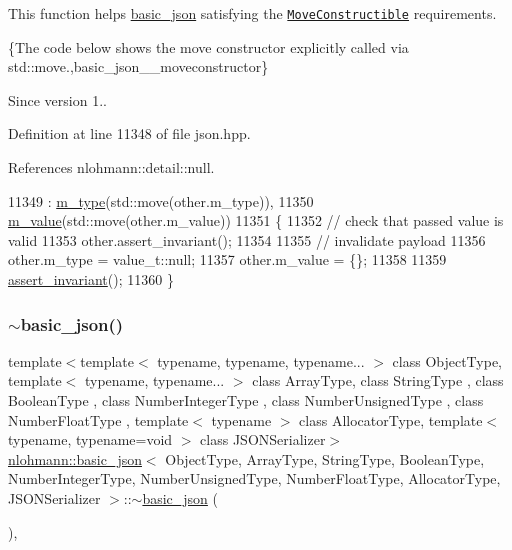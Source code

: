 This function helps {\ttfamily \hyperlink{classnlohmann_1_1basic__json}{basic\+\_\+json}} satisfying the \href{http://en.cppreference.com/w/cpp/concept/MoveConstructible}{\tt Move\+Constructible} requirements.

\{The code below shows the move constructor explicitly called via std\+::move.,basic\+\_\+json\+\_\+\+\_\+moveconstructor\}

\begin{DoxySince}{Since}
version 1.. 
\end{DoxySince}


Definition at line 11348 of file json.\+hpp.



References nlohmann\+::detail\+::null.


\begin{DoxyCode}
11349         : \hyperlink{classnlohmann_1_1basic__json_a91990b60d7d4d67968a2c1db677536e7}{m\_type}(std::move(other.m\_type)),
11350           \hyperlink{classnlohmann_1_1basic__json_aeb0814f76966f99290cb29e127c90a77}{m\_value}(std::move(other.m\_value))
11351     \{
11352         \textcolor{comment}{// check that passed value is valid}
11353         other.assert\_invariant();
11354 
11355         \textcolor{comment}{// invalidate payload}
11356         other.m\_type = value\_t::null;
11357         other.m\_value = \{\};
11358 
11359         \hyperlink{classnlohmann_1_1basic__json_a4a82d3fb7a111641decf35c2fb707c7f}{assert\_invariant}();
11360     \}
\end{DoxyCode}
\mbox{\label{classnlohmann_1_1basic__json_aba01953d5d90e676d504863b8d9fdde5}} 
\subsubsection{\texorpdfstring{$\sim$basic\+\_\+json()}{~basic\_json()}}
{\footnotesize\ttfamily template$<$template$<$ typename, typename, typename... $>$ class Object\+Type, template$<$ typename, typename... $>$ class Array\+Type, class String\+Type , class Boolean\+Type , class Number\+Integer\+Type , class Number\+Unsigned\+Type , class Number\+Float\+Type , template$<$ typename $>$ class Allocator\+Type, template$<$ typename, typename=void $>$ class J\+S\+O\+N\+Serializer$>$ \\
\hyperlink{classnlohmann_1_1basic__json}{nlohmann\+::basic\+\_\+json}$<$ Object\+Type, Array\+Type, String\+Type, Boolean\+Type, Number\+Integer\+Type, Number\+Unsigned\+Type, Number\+Float\+Type, Allocator\+Type, J\+S\+O\+N\+Serializer $>$\+::$\sim$\hyperlink{classnlohmann_1_1basic__json}{basic\+\_\+json} (\begin{DoxyParamCaption}{ }\end{DoxyParamCaption})\hspace{0.3cm}{\ttfamily [inline]}, {\ttfamily [noexcept]}}



